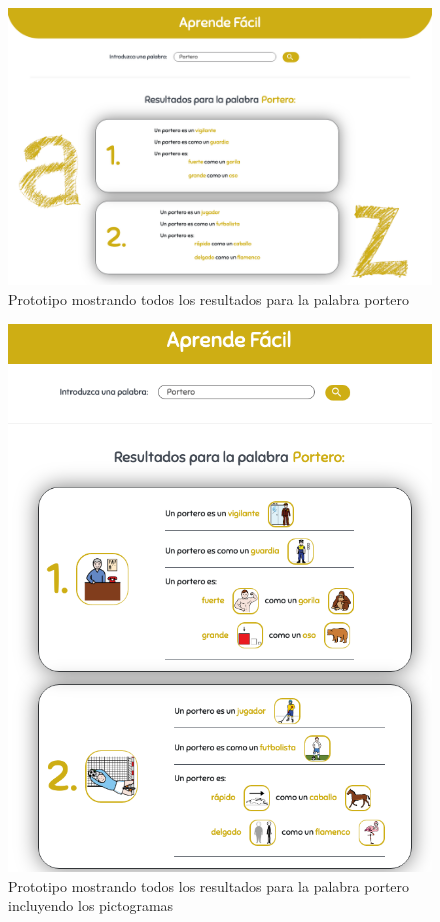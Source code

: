 \begin{figure}[!t]
	\includegraphics[width=.8\textwidth]{Imagenes/Bitmap/Mockups/mockup3_irene_final.png}
	\centering
	\caption{Prototipo mostrando todos los resultados para la palabra portero}
	\label{fig:mockup3irene_vFinal}
\end{figure}
\begin{figure}[!t]
	\includegraphics[width=.8\textwidth]{Imagenes/Bitmap/Mockups/mockup4_irene_final.png}
	\centering
	\caption{Prototipo mostrando todos los resultados para la palabra portero incluyendo los pictogramas}
	\label{fig:mockup4irene_vFinal}
\end{figure}

